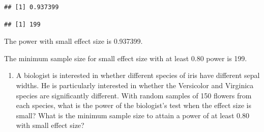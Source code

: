 \documentclass[
]{book}
\newenvironment{Shaded}{\begin{snugshade}}{\end{snugshade}}
\newcommand{\AttributeTok}[1]{\textcolor[rgb]{0.13,0.29,0.53}{#1}}
\newcommand{\DecValTok}[1]{\textcolor[rgb]{0.00,0.00,0.81}{#1}}
\newcommand{\DocumentationTok}[1]{\textcolor[rgb]{0.56,0.35,0.01}{\textbf{\textit{#1}}}}
\newcommand{\FloatTok}[1]{\textcolor[rgb]{0.00,0.00,0.81}{#1}}
\newcommand{\FunctionTok}[1]{\textcolor[rgb]{0.13,0.29,0.53}{\textbf{#1}}}
\newcommand{\NormalTok}[1]{#1}
\newcommand{\OtherTok}[1]{\textcolor[rgb]{0.56,0.35,0.01}{#1}}
\newcommand{\SpecialCharTok}[1]{\textcolor[rgb]{0.81,0.36,0.00}{\textbf{#1}}}
\newcommand{\StringTok}[1]{\textcolor[rgb]{0.31,0.60,0.02}{#1}}
\providecommand{\tightlist}{%
  \setlength{\itemsep}{0pt}\setlength{\parskip}{0pt}}
\theoremstyle{definition}
\theoremstyle{definition}
\theoremstyle{definition}
\theoremstyle{definition}
\theoremstyle{remark}
\begin{document}
\begin{Shaded}
\end{Shaded}

\begin{verbatim}
## [1] 0.937399
\end{verbatim}

\begin{Shaded}
\end{Shaded}

\begin{verbatim}
## [1] 199
\end{verbatim}

The power with small effect size is 0.937399.

The minimum sample size for small effect size with at least 0.80 power is 199.

\begin{enumerate}
\def\labelenumi{\arabic{enumi}.}
\setcounter{enumi}{2}
\tightlist
\item
  A biologist is interested in whether different species of iris have different sepal widths. He is particularly interested in whether the Versicolor and Virginica species are significantly different. With random samples of 150 flowers from each species, what is the power of the biologist's test when the effect size is small? What is the minimum sample size to attain a power of at least 0.80 with small effect size?
\end{enumerate}
\end{document}
